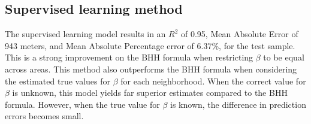 \subsection{Supervised learning method}
The supervised learning model results in an $R^2$ of 0.95, Mean Absolute Error of 943 meters, and Mean Absolute Percentage error of 6.37\%, for the test
sample. This is a strong improvement on the BHH formula when restricting $\beta$ to be equal across areas. This method also outperforms the BHH formula
when considering the estimated true values for $\beta$ for each neighborhood. 
When the correct value for $\beta$ is unknown, this model yields far superior estimates compared to the BHH formula. However, when the true value for 
$\beta$ is known, the difference in prediction errors becomes small.
